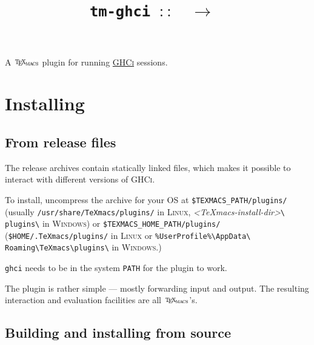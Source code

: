 \documentclass{article}
\newcommand{\TeXmacs}{\includegraphics[width=1.1cm,height=0.25cm]{texmacs-text.png}}
\renewcommand{\emph}[1]{\textit{#1}}
\begin{document}
\title{\texttt{tm-ghci\ $::$\ }
  $\mathtt{\rightarrow}$\ 
  }

\author{}
\date{}

\maketitle

A \href{https://texmacs.org/}{\TeXmacs} plugin for running
\href{https://wiki.haskell.org/GHC/GHCi}{\textsc{GHCi}} sessions.

\section{Installing}

\subsection{From release files}

The release archives contain statically linked files, which makes it possible
to interact with different versions of {\textsc{GHCi}}.

To install, uncompress the archive for your \textsc{OS} at
\texttt{\$TEXMACS\_PATH/plugins/}  (usually
\texttt{/usr/share/TeXmacs/plugins/}  in  \textsc{Linux},
\emph{\textless\textsf{TeXmacs-install-dir}\textgreater}\texttt{\textbackslash
plugins\textbackslash} in \textsc{Windows}) or
\texttt{\$TEXMACS\_HOME\_PATH/plugins/}
(\texttt{\$HOME/.TeXmacs/plugins/} in \textsc{Linux} or
\texttt{\%UserProfile\%\textbackslash AppData\textbackslash
Roaming\textbackslash TeXmacs\textbackslash plugins\textbackslash} in
\textsc{Windows}.)

\texttt{ghci} needs to be in the system \texttt{PATH} for the plugin
to work.

The plugin is rather simple --- mostly forwarding input and output. The
resulting interaction and evaluation facilities are all {\TeXmacs}'s.

\subsection{Building and installing from source}
\end{document}
